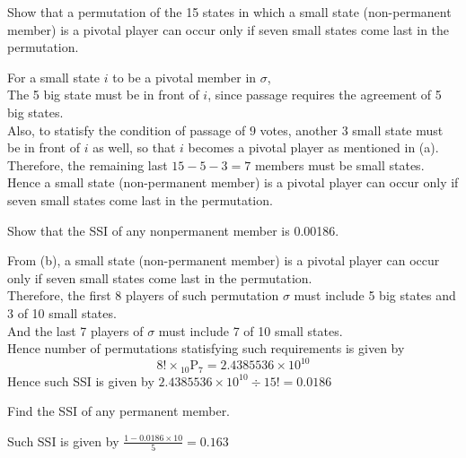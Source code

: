 \documentclass[12pt]{article}
\newenvironment{question}[2][Q]{\begin{trivlist}
    \item[\hskip \labelsep {\bfseries #1}\hskip \labelsep {\bfseries #2.}]}{\end{trivlist}}
\newenvironment{answer}[2][A]{\begin{trivlist}
    \item[\hskip \labelsep {\bfseries #1}\hskip \labelsep {\bfseries #2.}]}{\end{trivlist}}
\begin{document}
\begin{question}{2b}
	Show that a permutation of the 15 states in which a small state (non-permanent member)  is a pivotal player can occur only if seven small states come last in the permutation.
\end{question}
\begin{answer}{2b}
\end{answer}
For a small state $i$ to be a pivotal member in $\sigma$,\\
The 5 big state must be  in front of $i$, since passage requires the agreement of 5 big states. \\
Also, to statisfy the condition of passage of $9$ votes, another 3 small state must be in front of $i$ as well, so that $i$ becomes a pivotal player as mentioned in (a). \\
Therefore, the remaining last $15-5-3=7$ members must be small states.
Hence a small state (non-permanent member) is a pivotal player can occur only if seven small states come last in the permutation.

\begin{question}{2c}
	Show that the SSI of any nonpermanent member is 0.00186.
\end{question}
\begin{answer}{2c}
\end{answer}
From (b), a small state (non-permanent member) is a pivotal player can occur only if seven small states come last in the permutation. \\
Therefore, the first 8 players of such permutation $\sigma$ must include 5 big states and 3 of 10 small states. \\
And the last 7 players of $\sigma$ must include 7 of 10 small states. \\
Hence number of permutations statisfying such requirements is given by
\begin{equation}
	8! \times {}_{10} \mathrm P_7 = 2.4385536 \times 10^{10}
\end{equation}
Hence such SSI is given by $2.4385536 \times 10^{10} \div 15! = 0.0186$

\begin{question}{2d}
	Find the SSI of any permanent member.
\end{question}
\begin{answer}{2c}
	Such SSI is given by $\frac{1-0.0186\times 10}5=0.163$
\end{answer}

\end{document}

